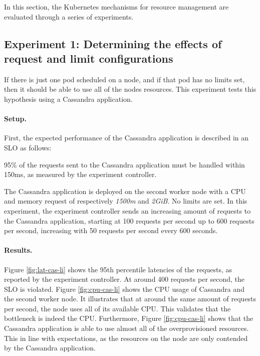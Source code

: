 In this section, the Kubernetes mechanisms for resource management are evaluated through a series of experiments. 

\subsection{Experiment 1: Determining the effects of request and limit configurations}
If there is just one pod scheduled on a node, and if that pod has no limits set, then it should be able to use all of the nodes resources. This experiment tests this hypothesis using a Cassandra application.

\paragraph{Setup.}
First, the expected performance of the Cassandra application is described in an SLO as follows:

\begin{slo}
95\% of the requests sent to the Cassandra application must be handled within 150ms, as measured by the experiment controller.
\end{slo}

The Cassandra application is deployed on the second worker node with a CPU and memory request of respectively \textit{1500m} and \textit{2GiB}. No limits are set. In this experiment, the experiment controller sends an increasing amount of requests to the Cassandra application, starting at 100 requests per second up to 600 requests per second, increasing with 50 requests per second every 600 seconds. 

\paragraph{Results.}
Figure \ref{fig:lat-cas-li} shows the 95th percentile latencies of the requests, as reported by the experiment controller. At around 400 requests per second, the SLO is violated. Figure \ref{fig:cpu-cas-li} shows the CPU usage of Cassandra and the second worker node. It illustrates that at around the same amount of requests per second, the node uses all of its available CPU. This validates that the bottleneck is indeed the CPU. Furthermore, Figure \ref{fig:cpu-cas-li} shows that the Cassandra application is able to use almost all of the overprovisioned resources. This in line with expectations, as the resources on the node are only contended by the Cassandra application.

